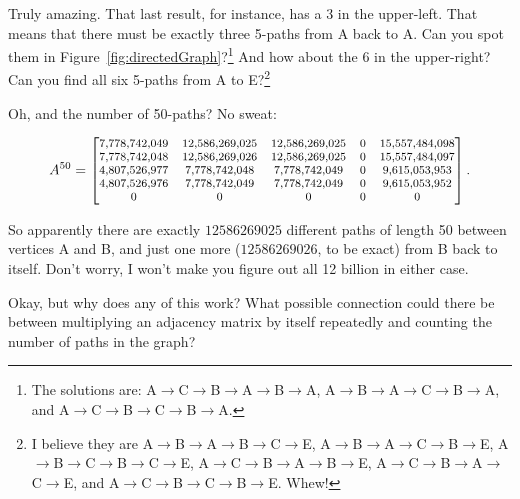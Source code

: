 Truly amazing. That last result, for instance, has a 3 in the upper-left. That
means that there must be exactly three 5-paths from A back to A. Can you spot
them in Figure~\ref{fig:directedGraph}?\footnote{The solutions are:
A$\rightarrow$C$\rightarrow$B$\rightarrow$A$\rightarrow$B$\rightarrow$A,
A$\rightarrow$B$\rightarrow$A$\rightarrow$C$\rightarrow$B$\rightarrow$A, and
A$\rightarrow$C$\rightarrow$B$\rightarrow$C$\rightarrow$B$\rightarrow$A.}
And how about the 6 in the upper-right? Can you find all six 5-paths from A to
E?\footnote{
I believe they are 
A$\rightarrow$B$\rightarrow$A$\rightarrow$B$\rightarrow$C$\rightarrow$E,
A$\rightarrow$B$\rightarrow$A$\rightarrow$C$\rightarrow$B$\rightarrow$E,
A$\rightarrow$B$\rightarrow$C$\rightarrow$B$\rightarrow$C$\rightarrow$E,
A$\rightarrow$C$\rightarrow$B$\rightarrow$A$\rightarrow$B$\rightarrow$E,
A$\rightarrow$C$\rightarrow$B$\rightarrow$A$\rightarrow$C$\rightarrow$E, and
A$\rightarrow$C$\rightarrow$B$\rightarrow$C$\rightarrow$B$\rightarrow$E. Whew!}

Oh, and the number of 50-paths? No sweat:

\vspace{-.20in}
\begin{align*}
\footnotesize
A^{50} = 
\begin{bmatrix}
 \num{7778742049} & \num{12586269025} &\num{12586269025} & 0 & \num{15557484098} \\
 \num{7778742048} & \num{12586269026} & \num{12586269025} & 0 & \num{15557484097} \\
 \num{4807526977} & \num{7778742048} & \num{7778742049} & 0 &  \num{9615053953} \\
 \num{4807526976} & \num{7778742049} & \num{7778742049} & 0 &  \num{9615053952} \\
          0      &               0 &                0 & 0 &                0 \\
\end{bmatrix}.
\end{align*}
\vspace{-.15in}

So apparently there are exactly $\num{12586269025}$ different paths of length
50 between vertices A and B, and just one more ($\num{12586269026}$, to be
exact) from B back to itself. Don't worry, I won't make you figure out all 12
billion in either case.

\smallskip

Okay, but why does any of this work? What possible connection could there be
between multiplying an adjacency matrix by itself repeatedly and counting the
number of paths in the graph?

